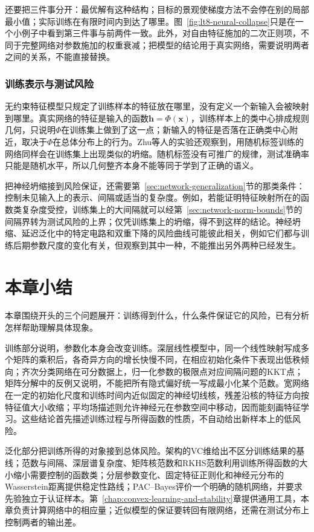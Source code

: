 还要把三件事分开：最优解有这种结构；目标的景观使梯度方法不会停在别的局部最小值；实际训练在有限时间内到达了哪里。图~\ref{fig:lt8-neural-collapse}只是在一个小例子中看到第三件事与前两件一致。此外，对自由特征施加的二次正则项，不同于完整网络对参数施加的权重衰减；把模型的结论用于真实网络，需要说明两者之间的关系，不能直接替换。

\subsubsection{训练表示与测试风险}

无约束特征模型只规定了训练样本的特征放在哪里，没有定义一个新输入会被映射到哪里。真实网络的特征是输入的函数$\bm h=\Phi(\bm x)$，训练样本上的类中心排成规则几何，只说明$\Phi$在训练集上做到了这一点；新输入的特征是否落在正确类中心附近，取决于$\Phi$在总体分布上的行为。Zhu等人的实验还观察到，用随机标签训练的网络同样会在训练集上出现类似的坍缩。随机标签没有可推广的规律，测试准确率只能是随机水平，所以几何整齐本身不能等同于学到了正确的语义。

把神经坍缩接到风险保证，还需要第~\ref{sec:network-generalization}节的那类条件：控制未见输入上的表示、间隔或适当的复杂度。例如，若能证明特征映射所在的函数类复杂度受控，训练集上的大间隔就可以经第~\ref{sec:network-norm-bounds}节的间隔界转为测试风险的上界；仅凭训练集上的坍缩，得不到这样的结论。神经坍缩、延迟泛化中的特定电路和双重下降的风险曲线可能彼此相关，例如它们都与训练后期参数尺度的变化有关，但观察到其中一种，不能推出另外两种已经发生。

\section{本章小结}
\label{sec:deep-learning-summary}

本章围绕开头的三个问题展开：训练得到什么，什么条件保证它的风险，已有分析怎样帮助理解具体现象。

训练部分说明，参数化本身会改变训练。深层线性模型中，同一个线性映射写成多个矩阵的乘积后，各奇异方向的增长快慢不同，在相应初始化条件下表现出低秩倾向；齐次分类网络在可分数据上，归一化参数的极限点对应间隔问题的KKT点；矩阵分解中的反例又说明，不能把所有隐式偏好统一写成最小化某个范数。宽网络在一定的初始化尺度和训练时间内近似固定的神经切线核，残差沿核的特征方向按特征值大小收缩；平均场描述则允许神经元在参数空间中移动，因而能刻画特征学习。这些结论首先描述训练过程与所得函数的性质，不自动给出新样本上的低风险。

泛化部分把训练所得的对象接到总体风险。架构的VC维给出不区分训练结果的基线；范数与间隔、深层谱复杂度、矩阵核范数和RKHS范数利用训练所得函数的大小缩小需要控制的函数类；分层参数变化、固定特征正则化和神经元分布的Wasserstein距离提供稳定性路线；PAC--Bayes评价一个明确的随机网络，并要求先验独立于认证样本。第~\ref{chap:convex-learning-and-stability}章提供通用工具，本章负责计算网络中的相应量；近似模型的保证要转回有限网络，还需在测试分布上控制两者的输出差。

